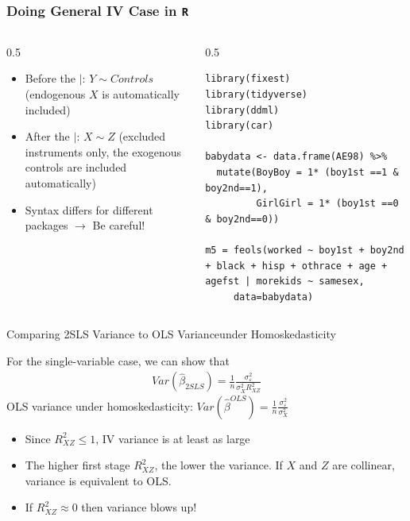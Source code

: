 \documentclass[aspectratio=169,11pt]{beamer}
\begin{document}
\begin{frame}[fragile]\frametitle{Doing General IV Case in \texttt{R}}
\begin{columns}
\begin{column}{0.5\textwidth}
\begin{itemize}
	\item Before the $\mid$: $Y \sim Controls$ (endogenous $X$ is automatically included)
	\item After the $\mid$: $X \sim Z$ (excluded instruments only, the exogenous controls are included automatically)
	\item Syntax differs for different packages $\rightarrow$ Be careful!
\end{itemize}
\end{column}
\begin{column}{0.5\textwidth}
\begin{lstlisting}
library(fixest)
library(tidyverse)
library(ddml)
library(car)

babydata <- data.frame(AE98) %>% 
  mutate(BoyBoy = 1* (boy1st ==1 & boy2nd==1),
         GirlGirl = 1* (boy1st ==0 & boy2nd==0))

m5 = feols(worked ~ boy1st + boy2nd + black + hisp + othrace + age + agefst | morekids ~ samesex,
     data=babydata)
\end{lstlisting}
\end{column}
\end{columns}


\end{frame}



\begin{frame}{Comparing 2SLS Variance to OLS Variance}{under Homoskedasticity}

For the single-variable case, we can show that
\begin{align*}
	Var(\hat\beta_{2SLS}) = \frac{1}{n}\frac{\sigma_{\varepsilon}^2}{\sigma^2_X R^2_{XZ}}
\end{align*}
	\smallskip
	OLS variance under homoskedasticity: $Var(\hat\beta^{OLS})=\frac{1}{n}\frac{\sigma_{\varepsilon}^2}{\sigma^2_X}$
		\begin{itemize}
			\item Since $R^2_{XZ}\leq 1$, IV variance is at least as large
			\item The higher first stage $R^2_{XZ}$, the lower the variance. If $X$ and $Z$ are collinear, variance is equivalent to OLS.
			\item If $R^2_{XZ}\approx 0$ then variance blows up!
		\end{itemize}
\end{frame}
\end{document}
